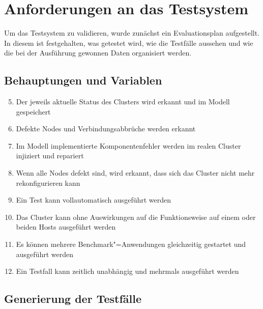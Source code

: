 \section{Anforderungen an das Testsystem}
\label{sec:evaluationPlan}

Um das Testsystem zu validieren, wurde zunächst ein Evaluationsplan aufgestellt.
In diesem ist festgehalten, was getestet wird, wie die Testfälle aussehen und wie die bei der Ausführung gewonnen Daten organisiert werden.

\subsection{Behauptungen und Variablen}
\label{sec:predictions}

\begin{enumerate}
    \setcounter{enumi}{4}
    \item Der jeweils aktuelle Status des Clusters wird erkannt und im Modell gespeichert
    \item Defekte Nodes und Verbindungsabbrüche werden erkannt
    \item Im Modell implementierte Komponentenfehler werden im realen Cluster injiziert und repariert
    \item Wenn alle Nodes defekt sind, wird erkannt, dass sich das Cluster nicht mehr rekonfigurieren kann
    \item Ein Test kann vollautomatisch ausgeführt werden
    \item Das Cluster kann ohne Auswirkungen auf die Funktionsweise auf einem oder beiden Hosts ausgeführt werden
    \item Es können mehrere Benchmark"=Anwendungen gleichzeitig gestartet und ausgeführt werden
    \item Ein Testfall kann zeitlich unabhängig und mehrmals ausgeführt werden
\end{enumerate}


\subsection{Generierung der Testfälle}
\label{sec:testcaseGeneration}

